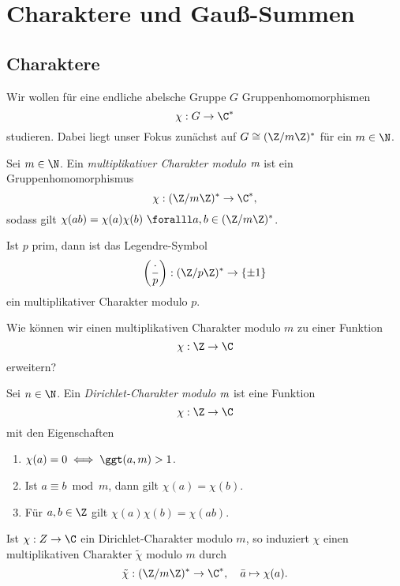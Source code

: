 \chapter{Charaktere und Gauß-Summen}
\section{Charaktere}

\begin{idee*}
	Wir wollen für eine endliche abelsche Gruppe $G$ Gruppenhomomorphismen
	\[ \chi: G \to \C^* \]
	studieren. Dabei liegt unser Fokus zunächst auf $G \cong (\Z/m\Z)^*$ für ein $m \in \N$.
\end{idee*}

\begin{defn*}[Charakter] 
	Sei $m \in \N$. Ein \emph{multiplikativer Charakter modulo \( \emph{m} \)} ist ein Gruppenhomomorphismus
	\[ \chi: (\Z/m\Z)^* \to \C^*, \]
	sodass gilt $\chi(ab) = \chi(a)\chi(b)\ \foralll a,b \in (\Z/m\Z)^*$.
\end{defn*}

\begin{exmp*}
	Ist $p$ prim, dann ist das Legendre-Symbol
	\[ \left(\frac{\cdot}{p}\right): (\Z/p\Z)^* \to \{\pm 1\} \]
	ein multiplikativer Charakter modulo $p$.
\end{exmp*}

\begin{frage*}
	Wie können wir einen multiplikativen Charakter modulo $m$ zu einer Funktion \[ \chi: \Z \to \C \] erweitern?
\end{frage*}

\begin{defn*} 
	Sei $n \in \N$. Ein \emph{Dirichlet-Charakter modulo $\emph{m}$} ist eine Funktion
	\[ \chi: \Z \to \C \]
	mit den Eigenschaften
	\begin{enumerate}[label={\roman*})]
		\item $\chi(a) = 0 \iff \ggt(a,m)>1$.
		\item Ist $a \equiv b \bmod m$, dann gilt $\chi(a)=\chi(b)$.
		\item Für $a,b \in \Z$ gilt $\chi(a)\chi(b)=\chi(ab)$.
	\end{enumerate}
\end{defn*}

\begin{rem*}
	Ist $\chi : Z \to \C$ ein Dirichlet-Charakter modulo $m$, so induziert $\chi$ einen multiplikativen Charakter $\tilde{\chi}$ modulo $m$ durch
	\[ \tilde{\chi}: (\Z/m\Z)^* \to \C^*,\quad \bar{a} \mapsto \chi(a). \]
\end{rem*}

